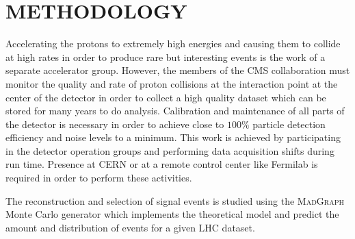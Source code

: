 \documentclass[final,3p]{CSP}
\begin{document}


\section{METHODOLOGY}






\onehalfspacing Accelerating the protons to extremely high energies and causing them to collide at high rates in order to produce rare but interesting events is the work of a separate accelerator group.
However, the members of the CMS collaboration must monitor the quality and rate of proton collisions at the interaction point at the center of the detector in order to collect a high quality dataset which can be stored for many years to do analysis.
Calibration and maintenance of all parts of the detector is necessary in order to achieve close to $100\%$ particle detection efficiency and noise levels to a minimum. This work is achieved by participating in the detector operation groups and performing data acquisition shifts during run time.  
Presence at CERN or at a remote control center like Fermilab is required in order to perform these activities. 

The reconstruction and selection of signal events is studied using the \textsc{MadGraph}~\cite{alwall2014automated} Monte Carlo generator which implements the theoretical model and predict the amount and distribution of events for a given LHC dataset.
\end{document}
